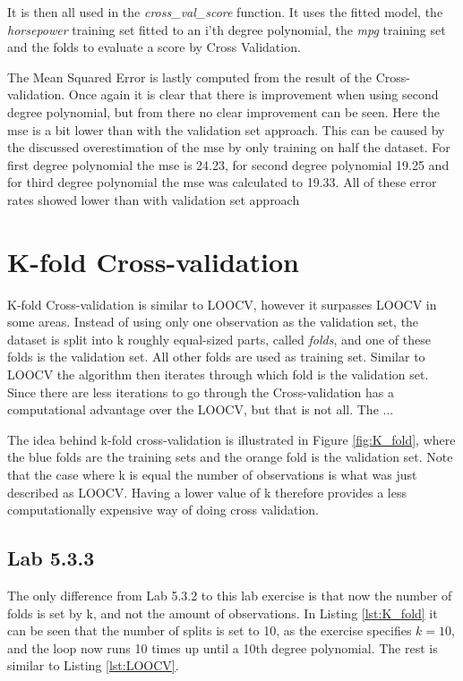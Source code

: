It is then all used in the \emph{cross\_val\_score} function. It uses the fitted model, the \emph{horsepower} training set fitted to an i'th degree polynomial, the \emph{mpg} training set and the folds to evaluate a score by Cross Validation.



The Mean Squared Error is lastly computed from the result of the Cross-validation. Once again it is clear that there is improvement when using second degree polynomial, but from there no clear improvement can be seen. Here the mse is a bit lower than with the validation set approach. This can be caused by the discussed overestimation of the mse by only training on half the dataset. For first degree polynomial the mse is 24.23, for second degree polynomial 19.25 and for third degree polynomial the mse was calculated to 19.33. All of these error rates showed lower than with validation set approach


\section{K-fold Cross-validation}
K-fold Cross-validation is similar to LOOCV, however it surpasses LOOCV in some areas. Instead of using only one observation as the validation set, the dataset is split into k roughly equal-sized parts, called \emph{folds}, and one of these folds is the validation set. All other folds are used as training set. Similar to LOOCV the algorithm then iterates through which fold is the validation set. Since there are less iterations to go through the Cross-validation has a computational advantage over the LOOCV, but that is not all. The ...


The idea behind k-fold cross-validation is illustrated in Figure \ref{fig:K_fold}, where the blue folds are the training sets and the orange fold is the validation set. Note that the case where k is equal the number of observations is what was just described as LOOCV. Having a lower value of k therefore provides a less computationally expensive way of doing cross validation.

\FloatBarrier
\subsection{Lab 5.3.3}
The only difference from Lab 5.3.2 to this lab exercise is that now the number of folds is set by k, and not the amount of observations. In Listing \ref{lst:K_fold} it can be seen that the number of splits is set to 10, as the exercise specifies $k=10$, and the loop now runs 10 times up until a 10th degree polynomial. The rest is similar to Listing \ref{lst:LOOCV}.

